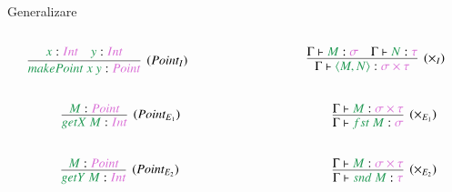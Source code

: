 \documentclass[xcolor=pdftex,romanian,colorlinks]{beamer}
\begin{document}
\begin{frame}{Generalizare}

\begin{columns}
\begin{column}{0.3\textwidth}
\[
\infer[(Point_I)]
	{{\color{True}makePoint\ x\ y} : \sel{Point}}
	{{\color{True}x} : \sel{Int} \quad {\color{True}y} : \sel{Int}}
\]
\end{column}
\begin{column}{0.1\textwidth}
\end{column}
\begin{column}{0.3\textwidth}
\[
\infer[(\times_I)]
	{\Gamma \vdash{\color{True}\langle M,N \rangle} : \sel{\sigma \times \tau}}
	{\Gamma \vdash{\color{True}M} : \sel{\sigma} \quad \Gamma \vdash {\color{True}N} : \sel{\tau}}
\]
\end{column}
\end{columns}

 \vspace{.6cm}

\begin{columns}
\begin{column}{0.3\textwidth}
\[\quad \quad
\infer[(Point_{E_1})]
	{{\color{True}getX\ M} : \sel{Int}}
	{{\color{True}M} : \sel{Point}}
\]
\end{column}
\begin{column}{0.1\textwidth}
\end{column}
\begin{column}{0.3\textwidth}
\[
\infer[(\times_{E_1})]
	{\Gamma \vdash{\color{True}fst\ M} : \sel{\sigma}}
	{\Gamma \vdash{\color{True}M} : \sel{\sigma \times \tau}}
\]
\end{column}
\end{columns}

 \vspace{.6cm}

\begin{columns}
\begin{column}{0.3\textwidth}
\[\quad \quad
\infer[(Point_{E_2})]
	{{\color{True}getY\ M} : \sel{Int}}
	{{\color{True}M} : \sel{Point}}
\]
\end{column}
\begin{column}{0.1\textwidth}
\end{column}
\begin{column}{0.3\textwidth}
\[
\infer[(\times_{E_2})]
	{\Gamma \vdash{\color{True}snd\ M} : \sel{\tau}}
	{\Gamma \vdash{\color{True}M} : \sel{\sigma \times \tau}}
\]
\end{column}

\end{columns}


\end{frame}
\end{document}

